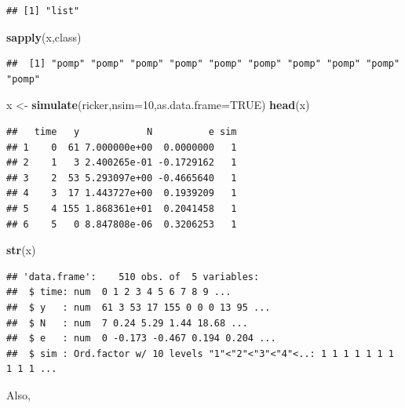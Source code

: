 \documentclass[]{article}
\newenvironment{Shaded}{\begin{snugshade}}{\end{snugshade}}
\newcommand{\KeywordTok}[1]{\textcolor[rgb]{0.13,0.29,0.53}{\textbf{#1}}}
\newcommand{\DataTypeTok}[1]{\textcolor[rgb]{0.13,0.29,0.53}{#1}}
\newcommand{\DecValTok}[1]{\textcolor[rgb]{0.00,0.00,0.81}{#1}}
\newcommand{\StringTok}[1]{\textcolor[rgb]{0.31,0.60,0.02}{#1}}
\newcommand{\OtherTok}[1]{\textcolor[rgb]{0.56,0.35,0.01}{#1}}
\newcommand{\NormalTok}[1]{#1}
\begin{document}
\begin{verbatim}
## [1] "list"
\end{verbatim}

\begin{Shaded}
\begin{Highlighting}[]
\KeywordTok{sapply}\NormalTok{(x,class)}
\end{Highlighting}
\end{Shaded}

\begin{verbatim}
##  [1] "pomp" "pomp" "pomp" "pomp" "pomp" "pomp" "pomp" "pomp" "pomp" "pomp"
\end{verbatim}

\begin{Shaded}
\begin{Highlighting}[]
\NormalTok{x <-}\StringTok{ }\KeywordTok{simulate}\NormalTok{(ricker,}\DataTypeTok{nsim=}\DecValTok{10}\NormalTok{,}\DataTypeTok{as.data.frame=}\OtherTok{TRUE}\NormalTok{)}
\KeywordTok{head}\NormalTok{(x)}
\end{Highlighting}
\end{Shaded}

\begin{verbatim}
##   time   y            N          e sim
## 1    0  61 7.000000e+00  0.0000000   1
## 2    1   3 2.400265e-01 -0.1729162   1
## 3    2  53 5.293097e+00 -0.4665640   1
## 4    3  17 1.443727e+00  0.1939209   1
## 5    4 155 1.868361e+01  0.2041458   1
## 6    5   0 8.847808e-06  0.3206253   1
\end{verbatim}

\begin{Shaded}
\begin{Highlighting}[]
\KeywordTok{str}\NormalTok{(x)}
\end{Highlighting}
\end{Shaded}

\begin{verbatim}
## 'data.frame':    510 obs. of  5 variables:
##  $ time: num  0 1 2 3 4 5 6 7 8 9 ...
##  $ y   : num  61 3 53 17 155 0 0 0 13 95 ...
##  $ N   : num  7 0.24 5.29 1.44 18.68 ...
##  $ e   : num  0 -0.173 -0.467 0.194 0.204 ...
##  $ sim : Ord.factor w/ 10 levels "1"<"2"<"3"<"4"<..: 1 1 1 1 1 1 1 1 1 1 ...
\end{verbatim}

Also,
\end{document}
